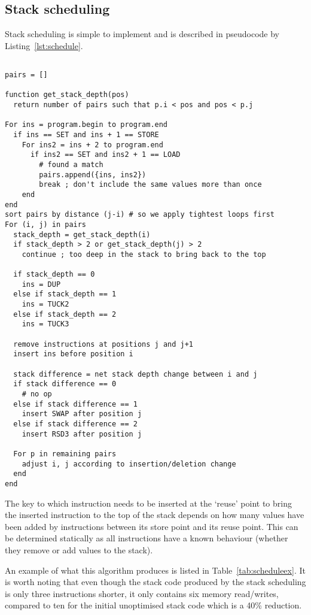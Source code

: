 \subsection{Stack scheduling}
Stack scheduling is simple to implement and is described in pseudocode by
Listing~\ref{lst:schedule}.

\begin{lstlisting}[caption={Stack scheduling
implementation},float,label=lst:schedule]

pairs = []

function get_stack_depth(pos)
  return number of pairs such that p.i < pos and pos < p.j

For ins = program.begin to program.end
  if ins == SET and ins + 1 == STORE
    For ins2 = ins + 2 to program.end
      if ins2 == SET and ins2 + 1 == LOAD
        # found a match
        pairs.append({ins, ins2})
        break ; don't include the same values more than once
    end
end
sort pairs by distance (j-i) # so we apply tightest loops first
For (i, j) in pairs
  stack_depth = get_stack_depth(i)
  if stack_depth > 2 or get_stack_depth(j) > 2
    continue ; too deep in the stack to bring back to the top

  if stack_depth == 0
    ins = DUP
  else if stack_depth == 1
    ins = TUCK2
  else if stack_depth == 2
    ins = TUCK3

  remove instructions at positions j and j+1
  insert ins before position i

  stack difference = net stack depth change between i and j
  if stack difference == 0
    # no op
  else if stack difference == 1
    insert SWAP after position j
  else if stack difference == 2
    insert RSD3 after position j

  For p in remaining pairs
    adjust i, j according to insertion/deletion change
  end
end
\end{lstlisting}

The key to which instruction needs to be inserted at the `reuse' point to bring
the inserted instruction to the top of the stack depends on how many values have
been added by instructions between its store point and its reuse point. This can
be determined statically as all instructions have a known behaviour (whether
they remove or add values to the stack).

An example of what this algorithm produces is listed in
Table~\ref{tab:scheduleex}. It is worth noting that even though the stack code
produced by the stack scheduling is only three instructions shorter, it only
contains six memory read/writes, compared to ten for the initial unoptimised
stack code which is a 40\% reduction.

